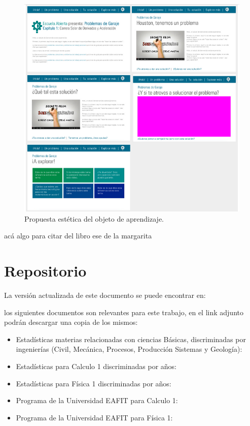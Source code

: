 \documentclass[twoside,letterpaper,12pt]{report}
\begin{document}
\begin{figure}[h!]
\label{propuesta}
\centering
\includegraphics[width=1\textwidth]{aux/propuestaEstetica}
\caption{Propuesta estética del objeto de aprendizaje.}
\end{figure}

acá algo para citar del libro ese de la margarita\cite{5seg}





\newpage

\appendix
\chapter{Repositorio}

La versión actualizada de este documento se puede encontrar en: 

los siguientes documentos son relevantes para este trabajo, en el link adjunto podrán descargar una copia de los mismos:

\begin{itemize}
	\item Estadísticas materias relacionadas con ciencias Básicas, discriminadas por ingenierías (Civil, Mecánica, Procesos, Producción Sistemas y Geología):

	\item Estadísticas para Calculo 1 discriminadas por años: 

	\item Estadísticas para Física 1 discriminadas por años:

	\item Programa de la Universidad EAFIT para Calculo 1: 

	\item Programa de la Universidad EAFIT para Física 1: 

\end{itemize}
\end{document}
